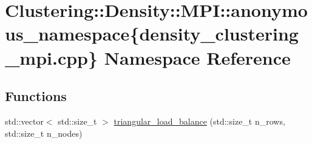 \hypertarget{namespaceClustering_1_1Density_1_1MPI_1_1anonymous__namespace_02density__clustering__mpi_8cpp_03}{\section{Clustering\-:\-:Density\-:\-:M\-P\-I\-:\-:anonymous\-\_\-namespace\{density\-\_\-clustering\-\_\-mpi.\-cpp\} Namespace Reference}
\label{namespaceClustering_1_1Density_1_1MPI_1_1anonymous__namespace_02density__clustering__mpi_8cpp_03}
}
\subsection*{Functions}
\begin{DoxyCompactItemize}
\item 
std\-::vector$<$ std\-::size\-\_\-t $>$ \hyperlink{namespaceClustering_1_1Density_1_1MPI_1_1anonymous__namespace_02density__clustering__mpi_8cpp_03_a7575c9743c40a1fdda4eddd7cd8aaca0}{triangular\-\_\-load\-\_\-balance} (std\-::size\-\_\-t n\-\_\-rows, std\-::size\-\_\-t n\-\_\-nodes)
\end{DoxyCompactItemize}


